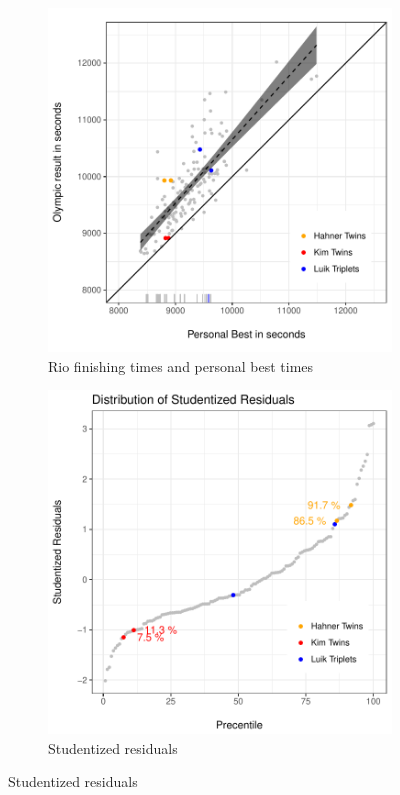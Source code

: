 \documentclass[12pt,titlepage]{article}
\begin{document}
\begin{figure}[!ht]
  \caption{Relationship between Personal Best and Result  -- caption?}
  \label{fig:scatter}
  \begin{subfigure}{.5\textwidth}
    \centering
    \includegraphics[width=\textwidth,
    keepaspectratio]{scatter_plot.pdf}
    \caption{Rio finishing times and personal best times}
    \label{fig:45degreeplot}
  \end{subfigure}
  \begin{subfigure}{.5\textwidth}
    \centering
    \includegraphics[width=.975\textwidth, keepaspectratio]{studentized_residuals.pdf}
    \caption{Studentized residuals}
    \label{fig:studentizedresiduals}
  \end{subfigure}
\end{figure}
\end{document}
